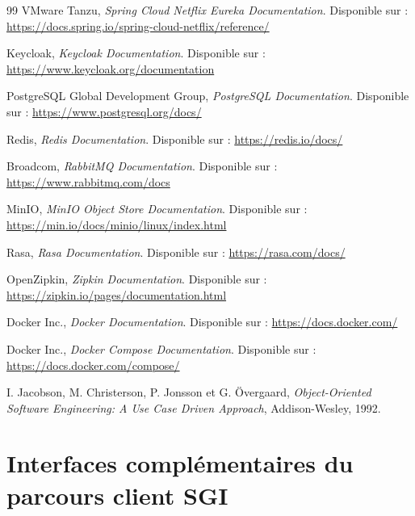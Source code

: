 \documentclass[a4paper,12pt]{report}
\begin{document}
\begin{thebibliography}{99}
VMware Tanzu, \textit{Spring Cloud Netflix Eureka Documentation}.
Disponible sur : \url{https://docs.spring.io/spring-cloud-netflix/reference/}

Keycloak, \textit{Keycloak Documentation}.
Disponible sur : \url{https://www.keycloak.org/documentation}

PostgreSQL Global Development Group, \textit{PostgreSQL Documentation}.
Disponible sur : \url{https://www.postgresql.org/docs/}

Redis, \textit{Redis Documentation}.
Disponible sur : \url{https://redis.io/docs/}

Broadcom, \textit{RabbitMQ Documentation}.
Disponible sur : \url{https://www.rabbitmq.com/docs}

MinIO, \textit{MinIO Object Store Documentation}.
Disponible sur : \url{https://min.io/docs/minio/linux/index.html}

Rasa, \textit{Rasa Documentation}.
Disponible sur : \url{https://rasa.com/docs/}

OpenZipkin, \textit{Zipkin Documentation}.
Disponible sur : \url{https://zipkin.io/pages/documentation.html}

Docker Inc., \textit{Docker Documentation}.
Disponible sur : \url{https://docs.docker.com/}

Docker Inc., \textit{Docker Compose Documentation}.
Disponible sur : \url{https://docs.docker.com/compose/}

I. Jacobson, M. Christerson, P. Jonsson et G. Övergaard, \textit{Object-Oriented Software Engineering: A Use Case Driven Approach}, Addison-Wesley, 1992.

\end{thebibliography}

\appendix
\renewcommand{\chaptername}{Annexe}

\chapter{Interfaces complémentaires du parcours client SGI}
\label{ann:interfaces-client-sgi}
\end{document}
